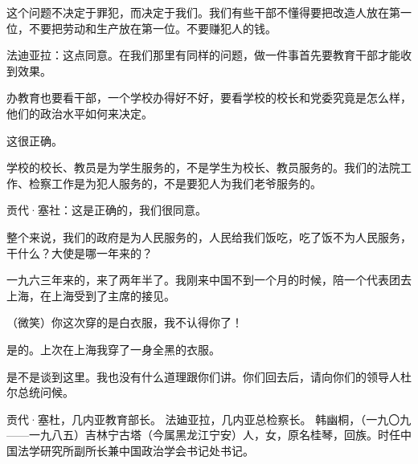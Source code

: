 这个问题不决定于罪犯，而决定于我们。我们有些干部不懂得要把改造人放在第一位，不要把劳动和生产放在第一位。不要赚犯人的钱。

法迪亚拉：这点同意。在我们那里有同样的问题，做一件事首先要教育干部才能收到效果。

办教育也要看干部，一个学校办得好不好，要看学校的校长和党委究竟是怎么样，他们的政治水平如何来决定。

这很正确。

学校的校长、教员是为学生服务的，不是学生为校长、教员服务的。我们的法院工作、检察工作是为犯人服务的，不是要犯人为我们老爷服务的。

贡代·塞社：这是正确的，我们很同意。

整个来说，我们的政府是为人民服务的，人民给我们饭吃，吃了饭不为人民服务，干什么？大使是哪一年来的？

一九六三年来的，来了两年半了。我刚来中国不到一个月的时候，陪一个代表团去上海，在上海受到了主席的接见。

（微笑）你这次穿的是白衣服，我不认得你了！

是的。上次在上海我穿了一身全黑的衣服。

是不是谈到这里。我也没有什么道理跟你们讲。你们回去后，请向你们的领导人杜尔总统问候。

\begin{maonote}
贡代·塞杜，几内亚教育部长。
法廸亚拉，几内亚总检察长。
韩幽桐，（一九〇九——一九八五）吉林宁古塔（今属黑龙江宁安）人，女，原名桂琴，回族。时任中国法学研究所副所长兼中国政治学会书记处书记。
\end{maonote}
